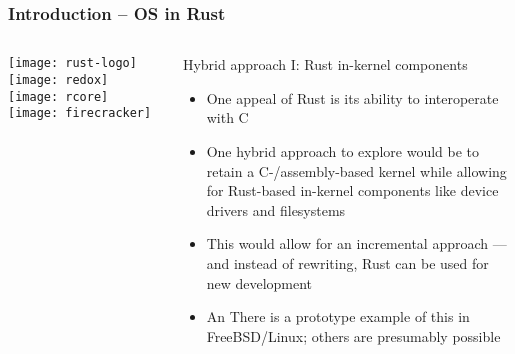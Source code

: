 \begin{frame}[plain]
	\frametitle{Introduction -- OS in Rust}
	
	
	
	\begin{columns}
		
		\begin{column}{.2\textwidth}
			
			\texttt{[image: rust-logo]}
			\texttt{[image: redox]}
			\texttt{[image: rcore]}
			\texttt{[image: firecracker]}
		\end{column}
		
		\begin{column}{.8\textwidth}
			
			Hybrid approach I: Rust in-kernel components
			
			
			\begin{itemize}
				
				\item One appeal of Rust is its ability to interoperate with C
				
				
				\item One hybrid approach to explore would be to retain a
				C-/assembly-based kernel while allowing for Rust-based
				in-kernel components like device drivers and filesystems
				
				\item  This would allow for an incremental approach — and instead of
				rewriting, Rust can be used for new development
				
				
				\item An There is a prototype example of this in FreeBSD/Linux; others are	presumably possible
				
				
				
			\end{itemize}
			
		\end{column}
		
		
	\end{columns}
	
	
\end{frame}



